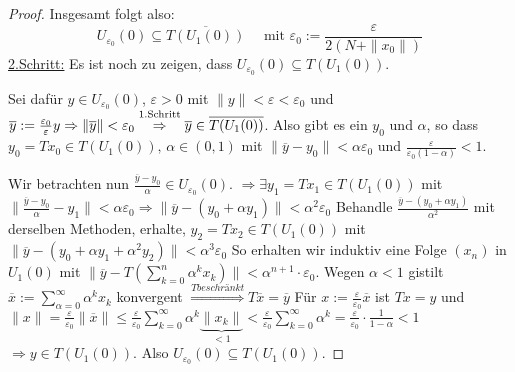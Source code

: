\documentclass[ngerman]{report}
\theoremstyle{plain}%
\theoremstyle{definition}%
\theoremstyle{myStyle}
\newcommand{\norm}[1]{\|#1\|}
\newcommand{\df}[1][]{%
	\overset{#1}{\Rightarrow}
}
\newcommand{\U}[2][1]{U_{#1}(#2)} %
\begin{document}
\begin{proof}
		 Insgesamt folgt also: $$U_{{\varepsilon_0}}(0)\subseteq \overline{T(U_1(0))} \quad \text{ mit } \varepsilon_0:=\frac{\varepsilon}{2(N+\|x_0\|)}$$
		 \underline{2.Schritt:} Es ist noch zu zeigen, dass $U_{\varepsilon_0}(0) \subseteq T(U_1(0)).$\par Sei dafür $y\in U_{\varepsilon_0}(0)$, $\varepsilon>0$ mit $\|y\|<\varepsilon<\varepsilon_0$ und $ \overline{y}:=\frac{\varepsilon_0}{\varepsilon}y \df \|\overline{y}\|<\varepsilon_0 \overset{\text{1.Schritt}}{\df} \overline{y}\in \overline{T(U_1(0))}$. Also gibt es ein $y_0$ und $\alpha$, so dass $y_0 = Tx_0 \in T(U_1(0)),\,\alpha \in (0,1)$ mit $\|\overline{y}-y_0\|<\alpha \varepsilon_0$ und $\frac{\varepsilon}{\varepsilon_0 (1-\alpha)}< 1$.\par 
		 Wir betrachten nun $\frac{\overline{y}-y_0}{\alpha}\in U_{\varepsilon_0}(0)$. 		 $\df \exists y_1 = Tx_1 \in {T(U_1(0))}$ mit $\norm{\frac{\overline{y}-y_0}{\alpha} - y_1} < \alpha \varepsilon_0
			\df \norm{\overline{y} - (y_0 + \alpha y_1)} < \alpha^2 \varepsilon_0$
			Behandle $\frac{\overline{y} - (y_0 +\alpha y_1)}{\alpha^2}$ mit derselben Methoden,
			erhalte, $y_2 = Tx_2 \in {T(U_1(0))}$ mit $\norm{\overline{y} - (y_0 + \alpha y_1 + \alpha^2 y_2)} < \alpha^3 \varepsilon_0$
			So erhalten wir induktiv eine Folge $(x_n)$ in $\U{0}$ mit $\norm{\overline{y} - T(\sum_{k=0}^n \alpha^k x_k)} < \alpha^{n+1} \cdot \varepsilon_0$.
			Wegen $\alpha < 1$ gistilt $\overline{x} := \sum_{\alpha=0}^\infty \alpha^k x_k$ konvergent
			$\df[T beschränkt] T\overline{x} = \overline{y}$ Für $x := \frac{\varepsilon}{\varepsilon_0} \overline{x}$
		ist $Tx = y$ und  
		$\norm{x} = \frac{\varepsilon}{\varepsilon_0} \norm{\overline{x}} \leq \frac{\varepsilon}{\varepsilon_0} \sum_{k=0}^\infty \alpha^k \underbrace{\norm{x_k}}_{< 1} < \frac{\varepsilon}{\varepsilon_0} \sum_{k=0}^\infty \alpha^k = \frac{\varepsilon}{\varepsilon_0} \cdot \frac{1}{1-\alpha} < 1$
		$\df y\in T(U_1(0)).$ Also $U_{\varepsilon_0}(0) \subseteq T(U_1(0))$.
		
		
	\end{proof}
\end{document}
